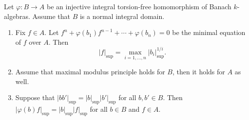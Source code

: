 \begin{proposition}\label{prop-fsupspecexp}
    Let $\varphi:B\rightarrow A$ be an injective integral torsion-free homomorphism of Banach $k$-algebras. Assume that $B$ is a normal integral domain. 
    \begin{enumerate}
        \item Fix $f\in A$.
        Let $f^n+\varphi(b_1)f^{n-1}+\cdots+\varphi(b_n)=0$ be the minimal equation of $f$ over $A$. Then
        \[
            |f|_{\sup}=\max_{i=1,\ldots,n} |b_i|_{\sup}^{1/i}.  
        \]
        \item Assume that maximal modulus principle holds for $B$, then it holds for $A$ as well.
        \item Suppose that $|bb'|_{\sup}=|b|_{\sup}|b'|_{\sup}$ for all $b,b'\in B$. Then $|\varphi(b)f|_{\sup}=|b|_{\sup}|f|_{\sup}$ for all $b\in B$ and $f\in A$.
    \end{enumerate}
\end{proposition}

